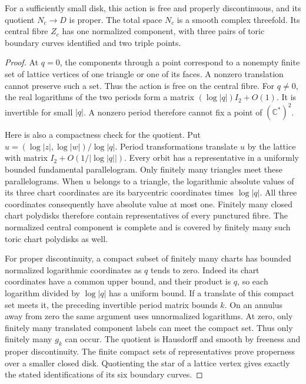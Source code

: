 \begin{proposition}\label{c26:prop:quotient}
For a sufficiently small disk, this action is free and properly
discontinuous, and its quotient $N_c\to D$ is proper.
The total space $N_c$ is a smooth complex threefold.
Its central fibre $Z_c$ has one normalized component, with three pairs
of toric boundary curves identified and two triple points.
\end{proposition}
\begin{proof}
At $q=0$, the components through a point correspond to a nonempty finite
set of lattice vertices of one triangle or one of its faces.
A nonzero translation cannot preserve such a set.
Thus the action is free on the central fibre.
For $q\ne0$, the real logarithms of the two periods form a matrix
$(\log|q|)I_2+O(1)$. It is invertible for small $|q|$.
A nonzero period therefore cannot fix a point of $(\mathbb C^*)^2$.

Here is also a compactness check for the quotient.
Put $u=(\log|z|,\log|w|)/\log|q|$.
Period transformations translate $u$ by the lattice with matrix
$I_2+O(1/|\log|q||)$.
Every orbit has a representative in a uniformly bounded fundamental
parallelogram. Only finitely many triangles meet these parallelograms.
When $u$ belongs to a triangle, the logarithmic absolute values of its
three chart coordinates are its barycentric coordinates times $\log|q|$.
All three coordinates consequently have absolute value at most one.
Finitely many closed chart polydisks therefore contain representatives
of every punctured fibre. The normalized central component is complete
and is covered by finitely many such toric chart polydisks as well.

For proper discontinuity, a compact subset of finitely many charts has
bounded normalized logarithmic coordinates as $q$ tends to zero.
Indeed its chart coordinates have a common upper bound, and their
product is $q$, so each logarithm divided by $\log|q|$ has a uniform bound.
If a translate of this compact set meets it, the preceding invertible
period matrix bounds $k$. On an annulus away from zero the same argument
uses unnormalized logarithms. At zero, only finitely many translated
component labels can meet the compact set.
Thus only finitely many $g_k$ can occur.
The quotient is Hausdorff and smooth by freeness and proper discontinuity.
The finite compact sets of representatives prove properness over a
smaller closed disk. Quotienting the star of a lattice vertex gives
exactly the stated identifications of its six boundary curves.
\end{proof}

